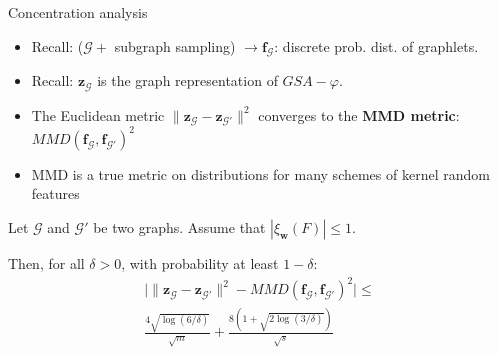 \documentclass{beamer}
\begin{document}
\begin{frame}{Concentration analysis}
    \footnotesize
    \begin{itemize}
 \item Recall: ($\mathcal{G} +$ subgraph sampling) $\rightarrow \mathbf{f}_\mathcal{G}$: discrete prob. dist. of graphlets.
    \vfill
  \item Recall: $\mathbf{z}_\mathcal{G}$ is the graph representation of $GSA-\varphi$.
  \vfill
        \item The Euclidean metric $\|\mathbf{z}_\mathcal{G} - \mathbf{z}_{\mathcal{G}'}\|^2$ converges to the \textbf{MMD metric}:    $MMD(\mathbf{f}_\mathcal{G},\mathbf{f}_{\mathcal{G}'})^2$\\
        \item MMD is a true metric on distributions for many schemes of kernel random features
    \end{itemize}
    \vfill
    \begin{theorem}
Let $\mathcal{G}$ and $\mathcal{G}'$ be two graphs.  Assume that $|\xi_\mathbf{w}(F)| \leq 1$.

Then, for all $\delta>0$, with probability at least $1-\delta$:
\begin{align*}
 \Big|\| \mathbf{z}_\mathcal{G} - \mathbf{z}_{\mathcal{G}'}\|^2 - MMD(\mathbf{f}_\mathcal{G},\mathbf{f}_{\mathcal{G}'})^2 \Big| \leq \\\frac{4 \sqrt{\log (6/\delta)}}{\sqrt{m}} + \frac{8\left(1+\sqrt{2\log(3/\delta)}\right)}{\sqrt{{s}}}
\end{align*}
\end{theorem}
\end{frame}
\end{document}
